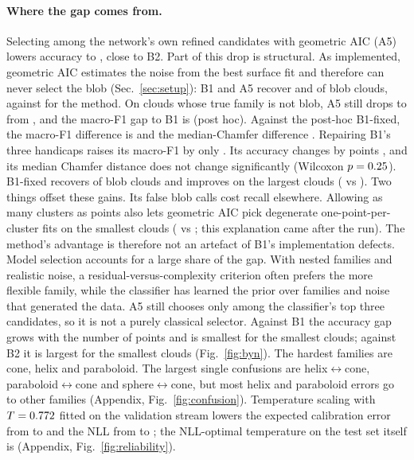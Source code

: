 \paragraph{Where the gap comes from.} Selecting among the network's own refined candidates with geometric AIC (A5) lowers accuracy to \accAfivegaic{}, close to B2. Part of this drop is structural. As implemented, geometric AIC estimates the noise from the best surface fit and therefore can never select the blob (Sec.~\ref{sec:setup}): B1 and A5 recover \blobRecallBone{} and \blobRecallAfivegaic{} of blob clouds, against \blobRecallMethod{} for the method. On clouds whose true family is not blob, A5 still drops to \nonblobAccAfivegaic{} from \nonblobAccMethod{}, and the macro-F1 gap to B1 is \estHoneNonblob{} \ciHoneNonblob{} (post hoc). Against the post-hoc B1-fixed, the macro-F1 difference is \estHoneBonefixed{} \ciHoneBonefixed{} and the median-Chamfer difference \estHtwoBonefixed{} \ciHtwoBonefixed{}. Repairing B1's three handicaps raises its macro-F1 by only \estFoneBonefixedVsBone{} \ciFoneBonefixedVsBone{}. Its accuracy changes by \estAccBonefixedVsBone{} points \ciAccBonefixedVsBone{}, and its median Chamfer distance does not change significantly (Wilcoxon $p=0.25{}$). B1-fixed recovers \blobRecallBonefixed{} of blob clouds and improves on the largest clouds (\accNlastBonefixed{} vs \accNlastBone{}). Two things offset these gains. Its false blob calls cost recall elsewhere. Allowing as many clusters as points also lets geometric AIC pick degenerate one-point-per-cluster fits on the smallest clouds (\accNfirstBonefixed{} vs \accNfirstBone{}; this explanation came after the run). The method's advantage is therefore not an artefact of B1's implementation defects. Model selection accounts for a large share of the gap. With nested families and realistic noise, a residual-versus-complexity criterion often prefers the more flexible family, while the classifier has learned the prior over families and noise that generated the data. A5 still chooses only among the classifier's top three candidates, so it is not a purely classical selector. Against B1 the accuracy gap grows with the number of points and is smallest for the smallest clouds; against B2 it is largest for the smallest clouds (Fig.~\ref{fig:byn}). The hardest families are cone, helix and paraboloid. The largest single confusions are helix$\leftrightarrow$cone, paraboloid$\leftrightarrow$cone and sphere$\leftrightarrow$cone, but most helix and paraboloid errors go to other families (Appendix, Fig.~\ref{fig:confusion}). Temperature scaling with $T=0.772$ fitted on the validation stream lowers the expected calibration error from \eceBefore{} to \eceAfter{} and the NLL from \nllBefore{} to \nllAfter{}; the NLL-optimal temperature on the test set itself is \temperatureTest{} (Appendix, Fig.~\ref{fig:reliability}).

